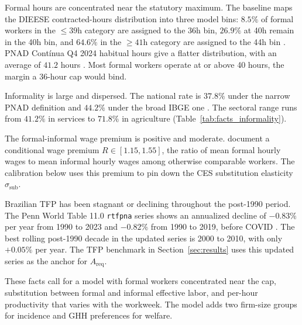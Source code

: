 
Formal hours are concentrated near the statutory maximum. The baseline maps the DIEESE contracted-hours distribution into three model bins: $8.5\%$ of formal workers in the $\leq 39$h category are assigned to the 36h bin, $26.9\%$ at 40h remain in the 40h bin, and $64.6\%$ in the $\geq 41$h category are assigned to the 44h bin \citep{DIEESE2024}. PNAD Cont\'{i}nua Q4 2024 habitual hours give a flatter distribution, with an average of $41.2$ hours \citep{PNAD2025}. Most formal workers operate at or above 40 hours, the margin a 36-hour cap would bind.

Informality is large and dispersed. The national rate is $37.8\%$ under the narrow PNAD definition and $44.2\%$ under the broad IBGE one \citep{PNAD2025}. The sectoral range runs from $41.2\%$ in services to $71.8\%$ in agriculture (Table~\ref{tab:facts_informality}).

The formal-informal wage premium is positive and moderate. \citet{MeghirNaritaRobin2015} document a conditional wage premium $R\in[1.15, 1.55]$, the ratio of mean formal hourly wages to mean informal hourly wages among otherwise comparable workers. The calibration below uses this premium to pin down the CES substitution elasticity $\sigma_{\text{sub}}$.

Brazilian TFP has been stagnant or declining throughout the post-1990 period. The Penn World Table 11.0 \texttt{rtfpna} series shows an annualized decline of $-0.83\%$ per year from 1990 to 2023 and $-0.82\%$ from 1990 to 2019, before COVID \citep{FeenstraInklaarTimmer2015,PWT2025,FREDPWTBrazil2026}. The best rolling post-1990 decade in the updated series is 2000 to 2010, with only $+0.05\%$ per year. The TFP benchmark in Section~\ref{sec:results} uses this updated series as the anchor for $A_{\text{req}}$.

These facts call for a model with formal workers concentrated near the cap, substitution between formal and informal effective labor, and per-hour productivity that varies with the workweek. The model adds two firm-size groups for incidence and GHH preferences for welfare.

